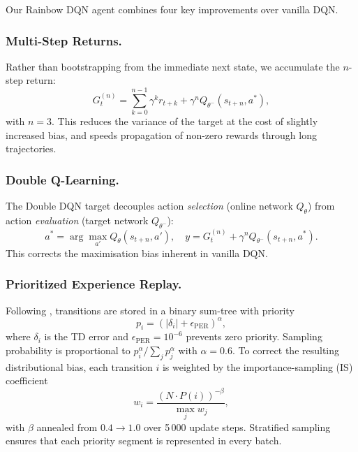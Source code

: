 \documentclass[10pt, letterpaper, twocolumn]{article}
\begin{document}
Our Rainbow DQN agent \citep{hessel2018rainbow} combines four key
improvements over vanilla DQN.

\subsubsection{Multi-Step Returns.}
Rather than bootstrapping from the immediate next state, we accumulate the
$n$-step return:
\begin{equation}
  G_t^{(n)} = \sum_{k=0}^{n-1} \gamma^k r_{t+k} + \gamma^n Q_{\theta^-}(s_{t+n}, a^*),
  \label{eq:nstep}
\end{equation}
with $n=3$.  This reduces the variance of the target at the cost of
slightly increased bias, and speeds propagation of non-zero rewards
through long trajectories.

\subsubsection{Double Q-Learning.}
The Double DQN target \citep{hasselt2016double} decouples action
\emph{selection} (online network $Q_\theta$) from action
\emph{evaluation} (target network $Q_{\theta^-}$):
\begin{equation}
  a^* = \arg\max_{a'} Q_\theta(s_{t+n}, a'), \quad
  y   = G_t^{(n)} + \gamma^n Q_{\theta^-}(s_{t+n}, a^*).
  \label{eq:double}
\end{equation}
This corrects the maximisation bias inherent in vanilla DQN.

\subsubsection{Prioritized Experience Replay.}
Following \citet{schaul2016per}, transitions are stored in a binary
sum-tree with priority
\begin{equation}
  p_i = (|\delta_i| + \epsilon_{\text{PER}})^\alpha,
  \label{eq:per_priority}
\end{equation}
where $\delta_i$ is the TD error and $\epsilon_{\text{PER}} = 10^{-6}$
prevents zero priority.  Sampling probability is proportional to $p_i^\alpha /
\sum_j p_j^\alpha$ with $\alpha = 0.6$.  To correct the resulting
distributional bias, each transition $i$ is weighted by the
importance-sampling (IS) coefficient
\begin{equation}
  w_i = \frac{(N \cdot P(i))^{-\beta}}{\max_j w_j},
  \label{eq:per_is}
\end{equation}
with $\beta$ annealed from $0.4 \to 1.0$ over 5\,000 update steps.
Stratified sampling ensures that each priority segment is represented in
every batch.
\end{document}
